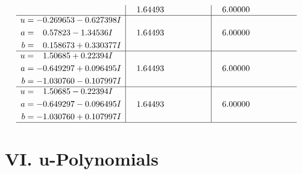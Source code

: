 \documentclass[1p]{elsarticle_modified}
\theoremstyle{definition}
\begin{document}
$$\begin{array}{c|c|c}
 & \phantom{-}1.64493\phantom{ +0.000000I} & \phantom{-}6.00000\phantom{ +0.000000I} \\ \hline\begin{aligned}
u &= -0.269653 - 0.627398 I \\
a &= \phantom{-}0.57823 - 1.34536 I \\
b &= \phantom{-}0.158673 + 0.330377 I\end{aligned}
 & \phantom{-}1.64493\phantom{ +0.000000I} & \phantom{-}6.00000\phantom{ +0.000000I} \\ \hline\begin{aligned}
u &= \phantom{-}1.50685 + 0.22394 I \\
a &= -0.649297 + 0.096495 I \\
b &= -1.030760 - 0.107997 I\end{aligned}
 & \phantom{-}1.64493\phantom{ +0.000000I} & \phantom{-}6.00000\phantom{ +0.000000I} \\ \hline\begin{aligned}
u &= \phantom{-}1.50685 - 0.22394 I \\
a &= -0.649297 - 0.096495 I \\
b &= -1.030760 + 0.107997 I\end{aligned}
 & \phantom{-}1.64493\phantom{ +0.000000I} & \phantom{-}6.00000\phantom{ +0.000000I}\\
 \hline 
 \end{array}$$\newpage
\newpage\renewcommand{\arraystretch}{1}
\centering \section*{ VI. u-Polynomials}
\end{document}
